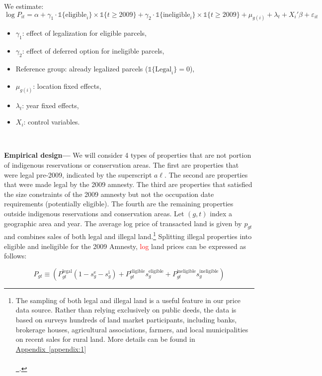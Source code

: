 \documentclass[12pt]{article}
\newcommand{\PTR}[1]{{\color{blue}{#1}}}
\newcommand*{\appendixref}[2][]{%
  \hyperref[{appendix:#2}]{%
    Appendix~\ref*{appendix:#2}%
    \ifx\\#1\\%
    \else
      \,#1%
    \fi
  }%
}
\begin{document}
\quad We estimate:
\[
\log P_{it} = \alpha + \gamma_1 \cdot \mathbb{1}\{\text{eligible}_i\}\times\mathbb{1}\{t\geq 2009\} + \gamma_2 \cdot \mathbb{1}\{\text{ineligible}_i\}\times\mathbb{1}\{t\geq 2009\} + \mu_{g(i)} + \lambda_t + X_i'\beta + \varepsilon_{it}
\]

\begin{itemize}
  \item $\gamma_1$: effect of legalization for eligible parcels,
  \item $\gamma_2$: effect of deferred option for ineligible parcels,
  \item Reference group: already legalized parcels ($\mathbb{1}\{\text{Legal}_i\} = 0$),
  \item $\mu_{g(i)}$: location fixed effects,
  \item $\lambda_t$: year fixed effects,
  \item $X_i$: control variables.
\end{itemize}
\fi
\ 

\quad \textbf{Empirical design---} We will consider 4 types of properties that are not portion of indigenous reservations or conservation  areas.   The first are properties that were legal pre-2009, indicated by the superscript $a\ell.$ The second are properties  that were made legal by the 2009 amnesty. The third are properties that satisfied the size constraints of the 2009 amnesty but not the occupation date requirements (potentially eligible).  The fourth are the remaining  properties outside indigenous reservations and conservation areas.  Let $(g, t)$ index a geographic area and year. The average log price of transacted land is given by $p_{gt}$ and combines sales of both legal and illegal land.\footnote{The sampling of both legal and illegal land is a useful feature in our price data source. Rather than relying exclusively on public deeds, the data is based on surveys hundreds of land market participants, including banks, brokerage houses, agricultural associations, farmers, and local municipalities on recent sales for rural land. More details can be found in \appendixref{1}.} Splitting illegal properties into eligible and ineligible for the 2009 Amnesty, \textcolor{red}{log} land prices can be expressed as follows:

\PTR{al := always legal, refers to properties pre-2009 that were already legalized; add sentence saying shares are determined in 2009 and don't change over time}
\begin{equation*}
P_{gt}\equiv \left(P_{gt}^{\text{legal}}(1-s_{g}^{\text{e}}-s_{g}^{\text{i}})+P_{gt}^{\text{eligible}}s_{g}^{\text{eligible}}+P_{gt}^{\text{ineligible}}s_{g}^{\text{ineligible}}\right)
\end{equation*}
\end{document}
